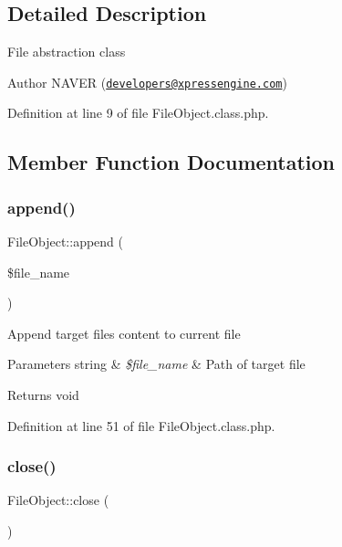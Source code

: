 \subsection{Detailed Description}
File abstraction class

\begin{DoxyAuthor}{Author}
N\+A\+V\+ER (\href{mailto:developers@xpressengine.com}{\tt developers@xpressengine.\+com}) 
\end{DoxyAuthor}


Definition at line 9 of file File\+Object.\+class.\+php.



\subsection{Member Function Documentation}
\mbox{\label{classFileObject_add062e05a5efc8c4c5947cbf3ff120a7}} 
\subsubsection{\texorpdfstring{append()}{append()}}
{\footnotesize\ttfamily File\+Object\+::append (\begin{DoxyParamCaption}\item[{}]{\$file\+\_\+name }\end{DoxyParamCaption})}

Append target file\textquotesingle{}s content to current file


\begin{DoxyParams}[1]{Parameters}
string & {\em \$file\+\_\+name} & Path of target file \\
\hline
\end{DoxyParams}
\begin{DoxyReturn}{Returns}
void 
\end{DoxyReturn}


Definition at line 51 of file File\+Object.\+class.\+php.

\mbox{\label{classFileObject_a14dcc624814271fb3f91a2a20a23ab24}} 
\subsubsection{\texorpdfstring{close()}{close()}}
{\footnotesize\ttfamily File\+Object\+::close (\begin{DoxyParamCaption}{ }\end{DoxyParamCaption})}

